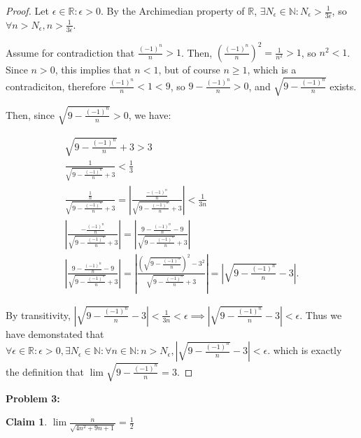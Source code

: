 \documentclass{article}
\newcommand{\reals}{\ensuremath{\mathbb{R}}}
\newcommand{\nats}{\ensuremath{\mathbb{N}}}
\newcommand{\eps}{\ensuremath{\epsilon}}
\newcommand{\neps}{\ensuremath{N_\epsilon}}
\newcommand{\overn}[1]{\ensuremath{\frac{#1}{n}}}
\newcommand{\movern}{\overn{(-1)^n}}
\newcommand{\bsn}{\sqrt{9-\movern}}
\newcommand{\csn}{\sqrt{4n^2+9n+1}}
\newtheorem{clm}{Claim}
\begin{document}
\begin{proof}
	Let $\eps \in \reals: \eps > 0$.
	By the Archimedian property of \reals,
	$\exists N_\eps \in \nats: N_\eps > \frac{1}{3\eps}$,
	so $\forall n > N_\eps, n > \frac{1}{3\eps}$.

	Assume for contradiction that
	$\frac{(-1)^n}{n} > 1$.
	Then, 
	$(\frac{(-1)^n}{n})^2 = \frac{1}{n^2} > 1$,
	so $n^2 < 1$.
	Since $n > 0$, this implies that $n < 1$,
	but of course $n \geq 1$,
	which is a contradiciton,
	therefore
	$\frac{(-1)^n}{n} < 1 < 9$,
	so $9 - \frac{(-1)^n}{n} > 0$,
	and $\bsn$ exists.

	Then, since $\bsn > 0$, we have:

	\begin{align}
		\bsn + 3 > 3 \\
		\frac{1}{\bsn + 3} < \frac{1}{3} \\
	\frac{\overn{1}}{\bsn + 3} = | \frac{\overn{-(-1)^n}}{\bsn + 3}| < \frac 1{3n} \\
	|\frac{-\movern}{\bsn + 3}| = |\frac{9-\movern-9}{\bsn + 3}| \\
|\frac{9-\movern-9}{\bsn + 3}| = |\frac{(\bsn)^2-3^2}{\bsn + 3}| = |\bsn - 3|.
\end{align}

	By transitivity, $|\bsn - 3| < \frac{1}{3n} < \eps
	\implies |\bsn - 3| < \eps$.
	Thus we have demonstated that $\forall \eps \in \reals : \eps > 0, \exists \neps \in \nats:
	\forall n \in \nats: n > \neps,
	|\bsn - 3| < \eps$.
	which is exactly the definition that
	$\lim \sqrt{9-\frac{(-1)^n}{n}} = 3$.
\end{proof}

\textbf{Problem 3:}

\begin{clm} \label{c3}
	$\lim \frac{n}{\csn} = \frac{1}{2}$
\end{clm}
\end{document}
